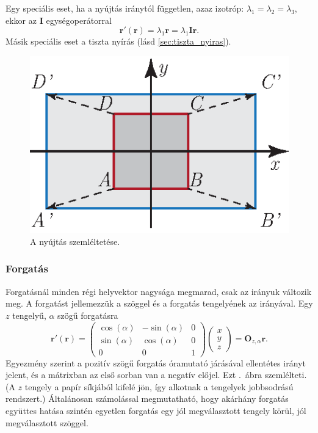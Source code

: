\documentclass[12pt,a4paper]{scrartcl}
\let\mathbf\bm
\begin{document}
Egy speciális eset, ha a  nyújtás iránytól független, azaz izotróp: ${\lambda _1} = {\lambda _2} = {\lambda _3}$, ekkor az ${\mathbf{I}}$ egységoperátorral
\[{\mathbf{r}}'\left( {\mathbf{r}} \right) = {\lambda _1}{\mathbf{r}} = {\lambda _1}{\mathbf{Ir}}.\] Másik speciális eset a tiszta nyírás (lásd \ref{sec:tiszta_nyiras}).
\begin{figure}[htb] 
\centering    
\includegraphics[scale=1]{figs/nyujtas.eps}
\caption{A nyújtás szemléltetése.}
\label{fig:nyujtas}
\end{figure}
\subsubsection{Forgatás}
Forgatásnál minden régi helyvektor nagysága megmarad, csak az irányuk változik meg. A forgatást jellemezzük a szöggel és a forgatás tengelyének az irányával. Egy $z$ tengelyű, $\alpha$ szögű forgatásra
\[{\mathbf{r}}'\left( {\mathbf{r}} \right) = \left( {\begin{array}{*{20}{c}}
  {\cos \left( \alpha  \right)}&{ - \sin \left( \alpha  \right)}&0 \\ 
  { \sin \left( \alpha  \right)}&{\cos \left( \alpha  \right)}&0 \\ 
  0&0&1 
\end{array}} \right)\left( {\begin{array}{*{20}{c}}
  x \\ 
  y \\ 
  z 
\end{array}} \right) = {{\mathbf{O}}_{z,\alpha }}{\mathbf{r}}.\]
Egyezmény szerint a pozitív szögű forgatás óramutató járásával ellentétes irányt jelent, és a mátrixban az első sorban van a negatív előjel. Ezt \az{\ref{fig:eltolas}}.\ ábra szemlélteti. (A $z$ tengely a papír síkjából kifelé jön, így alkotnak a tengelyek jobbsodrású rendszert.) Általánosan számolással megmutatható, hogy akárhány forgatás együttes hatása szintén egyetlen forgatás egy jól megválasztott tengely körül, jól megválasztott szöggel.
\end{document}
